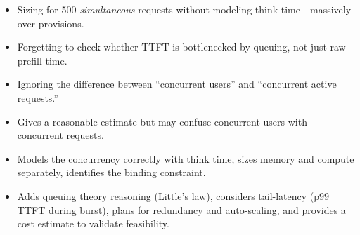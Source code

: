 \begin{interviewq}
\redflags
\begin{itemize}
    \item Sizing for 500 \textit{simultaneous} requests without modeling think time---massively over-provisions.
    \item Forgetting to check whether TTFT is bottlenecked by queuing, not just raw prefill time.
    \item Ignoring the difference between ``concurrent users'' and ``concurrent active requests.''
\end{itemize}


\goodgreat
\begin{itemize}
    \item {} Gives a reasonable estimate but may confuse concurrent users with concurrent requests.
    \item {} Models the concurrency correctly with think time, sizes memory and compute separately, identifies the binding constraint.
    \item {} Adds queuing theory reasoning (Little's law), considers tail-latency (p99 TTFT during burst), plans for redundancy and auto-scaling, and provides a cost estimate to validate feasibility.
\end{itemize}

\end{interviewq}


